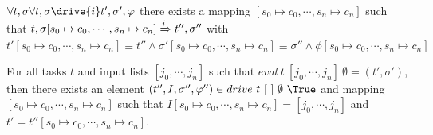 \begin{lemma}
  $\forall t,\sigma \forall t,\sigma\drive{i} t',\sigma',\phi$
  there exists a mapping $[s_0\mapsto c_0,\cdots,s_n\mapsto c_n]$
  such that $t,\sigma [s_0\mapsto c_0,\cdots,s_n\mapsto c_n] \xRightarrow[]{i} t'',\sigma''$
  with $t'[s_0\mapsto c_0,\cdots,s_n\mapsto c_n] \equiv t'' \wedge \sigma' [s_0\mapsto c_0,\cdots,s_n\mapsto c_n] \equiv \sigma'' \wedge \phi [s_0\mapsto c_0,\cdots,s_n\mapsto c_n]$
\end{lemma}


\begin{theorem}
For all tasks $t$ and input lists $[j_0,\cdots,j_n]$ such that $eval\ t\ [j_0,\cdots,j_n]\ \emptyset = (t',\sigma')$,
then there exists an element $(t'',I,\sigma'',\phi'')\in drive\ t\ [\ ]\ \emptyset\ \True$ and mapping $[s_0\mapsto c_0,\cdots,s_n\mapsto c_n]$ such that
$I[s_0\mapsto c_0,\cdots,s_n\mapsto c_n]=[j_0,\cdots,j_n]$ and $t'=t''[s_0\mapsto c_0,\cdots,s_n\mapsto c_n]$.
  \label{thm:complete}
\end{theorem}
